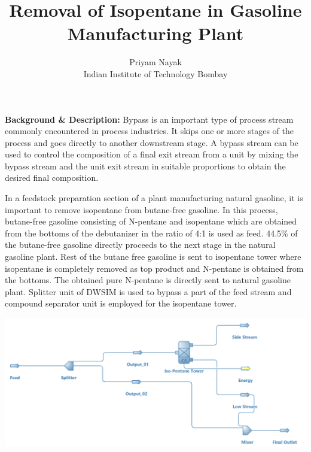 \documentclass[a4paper,12pt]{article}
\title{Removal of Isopentane in Gasoline Manufacturing Plant}
\author{Priyam Nayak \\ Indian Institute of Technology Bombay}
\date{}
\begin{document}
\maketitle

\noindent \textbf{Background \& Description:}
\newline Bypass is an important type of process stream commonly encountered in process industries. It skips one or more stages of the process and goes directly to another downstream stage. A bypass stream can be used to control the composition of a final exit stream from a unit by mixing the bypass stream and the unit exit stream in suitable proportions to obtain the desired final composition.

In a feedstock preparation section of a plant manufacturing natural gasoline, it is important to remove isopentane from butane-free gasoline. In this process, butane-free gasoline consisting of N-pentane and isopentane which are obtained from the bottoms of the debutanizer in the ratio of 4:1 is used as feed. 44.5\% of the butane-free gasoline directly proceeds to the next stage in the natural gasoline plant. Rest of the butane free gasoline is sent to isopentane tower where isopentane is completely removed as top product and N-pentane is obtained from the bottoms. The obtained pure N-pentane is directly sent to natural gasoline plant. Splitter unit of DWSIM is used to bypass a part of the feed stream and compound separator unit is employed for the isopentane tower. 

\vspace{25mm}
\centerline{\includegraphics[width=1\linewidth]{Isopent-Rem.png}}
\end{document}
